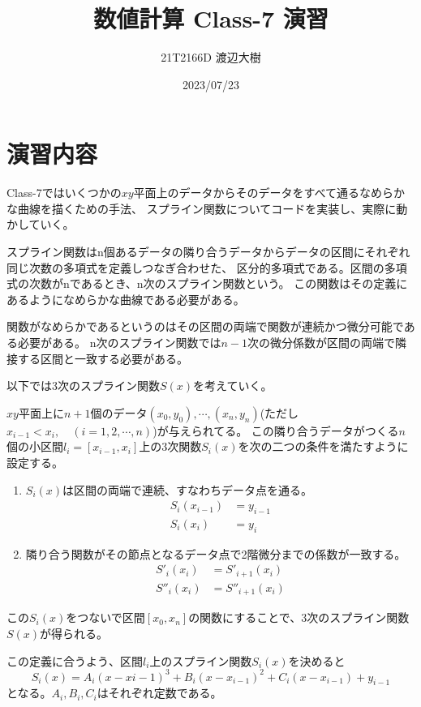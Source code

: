 \documentclass[a4paper,11pt,dvipdfmx]{jsarticle}
\begin{document}

\title{数値計算 Class-7 演習}
\author{21T2166D 渡辺大樹}
\date{2023/07/23}
\maketitle

\section{演習内容}
Class-7ではいくつかの$xy$平面上のデータからそのデータをすべて通るなめらかな曲線を描くための手法、
スプライン関数についてコードを実装し、実際に動かしていく。

スプライン関数はn個あるデータの隣り合うデータからデータの区間にそれぞれ同じ次数の多項式を定義しつなぎ合わせた、
区分的多項式である。区間の多項式の次数がnであるとき、n次のスプライン関数という。
この関数はその定義にあるようになめらかな曲線である必要がある。

関数がなめらかであるというのはその区間の両端で関数が連続かつ微分可能である必要がある。
n次のスプライン関数では$n-1$次の微分係数が区間の両端で隣接する区間と一致する必要がある。

以下では3次のスプライン関数$S(x)$を考えていく。

$xy$平面上に$n+1$個のデータ$(x_0,y_0),\cdots,(x_n,y_n)$(ただし$x_{i-1}<x_i,\quad(i=1,2,\cdots,n)$)が与えられてる。
この隣り合うデータがつくる$n$個の小区間$l_i=[x_{i-1},x_i]$上の3次関数$S_i(x)$を次の二つの条件を満たすように設定する。
\begin{enumerate}
    \item $S_i(x)$は区間の両端で連続、すなわちデータ点を通る。
    \begin{align*}
        S_i(x_{i-1}) & = y_{i-1}\\
        S_i(x_{i}) & = y_{i}
    \end{align*}
    \item 隣り合う関数がその節点となるデータ点で2階微分までの係数が一致する。
    \begin{align*}
        S'_i(x_i) & =S'_{i+1}(x_i) \\
        S''_i(x_i) & =S''_{i+1}(x_i)
    \end{align*}
\end{enumerate}

この$S_i(x)$をつないで区間$[x_0,x_n]$の関数にすることで、3次のスプライン関数$S(x)$が得られる。

この定義に合うよう、区間$l_i$上のスプライン関数$S_i(x)$を決めると
\[S_i(x)=A_i(x-x{i-1})^3+B_i(x-x_{i-1})^2+C_i(x-x_{i-1})+y_{i-1}\]
となる。$A_i,B_i,C_i$はそれぞれ定数である。
\end{document}

